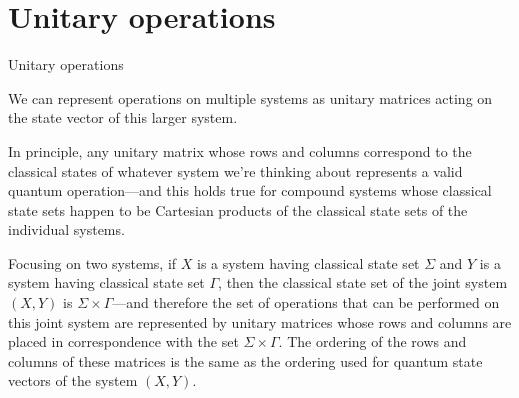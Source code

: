 \documentclass[12pt, aspectratio=169]{beamer}
\begin{document}
\section{Unitary operations}
\begin{frame}{Unitary operations}

We can represent operations on multiple systems as unitary matrices acting on the state vector of this larger system.

In principle, any unitary matrix whose rows and columns correspond to the classical states of whatever system we're thinking about represents a valid quantum operation—and this holds true for compound systems whose classical state sets happen to be Cartesian products of the classical state sets of the individual systems.

Focusing on two systems, if \(X\) is a system having classical state set \(\Sigma\) and \(Y\) is a system having classical state set \(\Gamma\), then the classical state set of the joint system \((X,Y)\) is \(\Sigma\times\Gamma\)—and therefore the set of operations that can be performed on this joint system are represented by unitary matrices whose rows and columns are placed in correspondence with the set \(\Sigma\times\Gamma\). The ordering of the rows and columns of these matrices is the same as the ordering used for quantum state vectors of the system \((X,Y)\).



\end{frame}
\end{document}
